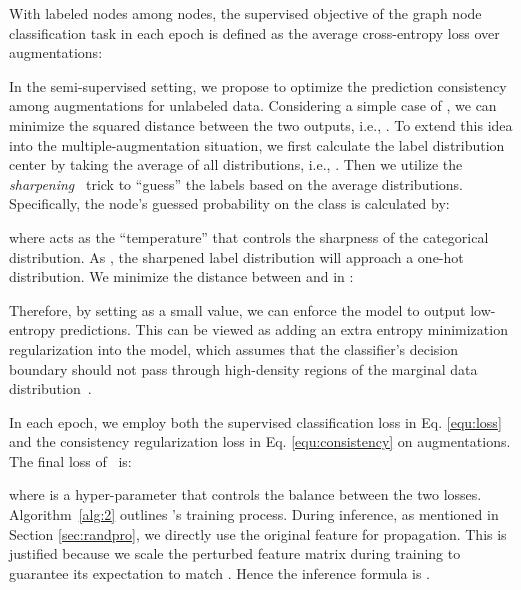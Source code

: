With  labeled nodes among  nodes, the supervised objective of the graph node classification task in each epoch is defined as the average cross-entropy loss over  augmentations:







In the semi-supervised setting, we propose to optimize the prediction consistency among  augmentations for unlabeled data. 
Considering a simple case of , we can minimize the squared  distance between the two outputs, i.e.,
 .
To extend this idea into the multiple-augmentation situation, 
we first 
calculate the label distribution center by taking the average of all distributions, i.e., 
 . Then we utilize the \textit{sharpening}~\cite{berthelot2019mixmatch} trick to ``guess'' the labels based on the average distributions. Specifically, the  node's guessed probability on the  class is calculated by:
\hide{

}

where  acts as the ``temperature'' that controls the sharpness of the categorical distribution. 
As , the sharpened label distribution will approach a one-hot distribution. 
We minimize the distance between   and  in \model:



Therefore, by setting  as a small value, we can enforce the model to output low-entropy predictions. 
This can be viewed as adding an extra entropy minimization regularization into the model, which assumes that the classifier's decision boundary should not pass through high-density regions of the marginal data distribution~\cite{grandvalet2005semi}. 





In each epoch, we employ both the supervised classification loss in Eq. \ref{equ:loss} and the consistency regularization loss in Eq. \ref{equ:consistency} on  augmentations. 
The final loss of \model\ is:

where  is a hyper-parameter that controls the balance between the two losses. 
Algorithm~\ref{alg:2} outlines \model's training process. 
During inference, as mentioned in Section \ref{sec:randpro}, we directly use the original feature   for propagation. 
This is justified because we scale  the perturbed feature matrix  during training to guarantee its expectation to match . Hence the inference formula is .


